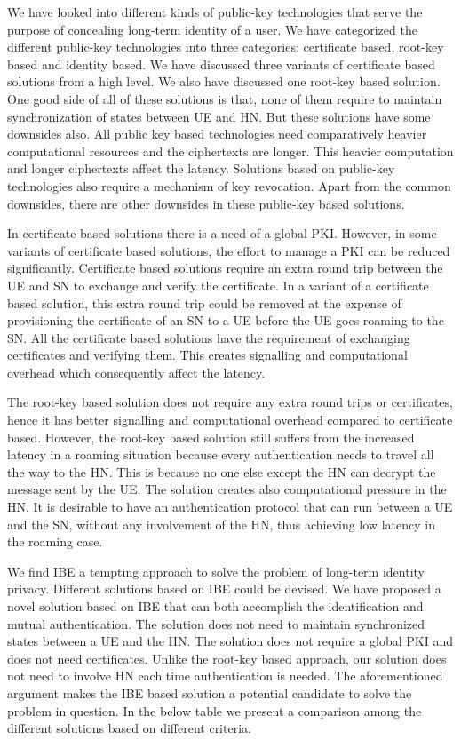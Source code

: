 \documentclass[runningheads,a4paper]{llncs} %
\begin{document}
We have looked into different kinds of public-key technologies that serve the purpose of concealing long-term identity of a user. We have categorized the different public-key technologies into three categories: certificate based, root-key based and identity based. We have discussed three variants of certificate based solutions from a high level. We also have discussed one root-key based solution. One good side of all of these solutions is that, none of them require to maintain synchronization of states between UE and HN. But these solutions have some downsides also. All public key based technologies need comparatively heavier computational resources and the ciphertexts are longer. This heavier computation and longer ciphertexts affect the latency. Solutions based on public-key technologies also require a mechanism of key revocation. Apart from the common downsides, there are other downsides in these public-key based solutions.

In certificate based solutions there is a need of a global PKI. However, in some variants of certificate based solutions, the effort to manage a PKI can be reduced significantly. Certificate based solutions require an extra round trip between the UE and SN to exchange and verify the certificate. In a variant of a certificate based solution, this extra round trip could be removed at the expense of provisioning the certificate of an SN to a UE before the UE goes roaming to the SN. All the certificate based solutions have the requirement of exchanging certificates and verifying them. This creates signalling and computational overhead which consequently affect the latency. 

The root-key based solution does not require any extra round trips or certificates, hence it has better signalling and computational overhead compared to certificate based. However, the root-key based solution still suffers from the increased latency in a roaming situation because every authentication needs to travel all the way to the HN. This is because no one else except the HN can decrypt the message sent by the UE. The solution creates also computational pressure in the HN. It is desirable to have an authentication protocol that can run between a UE and the SN, without any involvement of the HN, thus achieving low latency in the roaming case.

We find IBE a tempting approach to solve the problem of long-term identity privacy. Different solutions based on IBE could be devised. We have proposed a novel solution based on IBE that can both accomplish the identification and mutual authentication. The solution does not need to maintain synchronized states between a UE and the HN. The solution does not require a global PKI and does not need certificates. Unlike the root-key based approach, our solution does not need to involve HN each time authentication is needed. The aforementioned argument makes the IBE based solution a potential candidate to solve the problem in question. In the below table we present a comparison among the different solutions based on different criteria.
\end{document}
